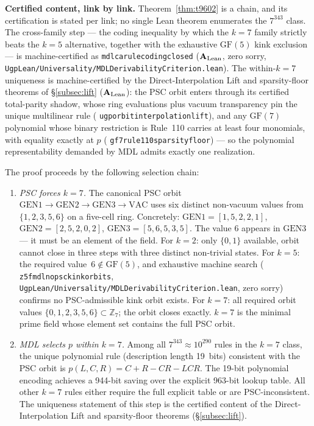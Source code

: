 \documentclass[11pt]{article}
\theoremstyle{remark}
\newcommand{\ZS}{\ensuremath{\mathbb{Z}_7}}
\newcommand{\GF}[1]{\ensuremath{\mathrm{GF}(#1)}}
\newcommand{\lean}[1]{%
  \penalty-100
  \begingroup\def\_{\textunderscore\allowbreak}\texttt{#1}\endgroup}
\newcommand{\CatAL}{\texorpdfstring{\ensuremath{\textbf{A}_{\rm Lean}}}{A-Lean}}
\begin{document}
\medskip
\noindent\textbf{Certified content, link by link.}
Theorem~\ref{thm:t9602} is a chain, and its certification is stated per
link; no single Lean theorem enumerates the $7^{343}$ class. The
cross-family step --- the coding inequality by which the $k = 7$ family
strictly beats the $k = 5$ alternative, together with the exhaustive
$\GF{5}$ kink exclusion --- is machine-certified as
\lean{mdl\_ca\_rule\_coding\_closed} (\CatAL{}, zero sorry,
\lean{UgpLean/Universality/MDLDerivabilityCriterion.lean}). The
within-$k{=}7$ uniqueness is machine-certified by the Direct-Interpolation
Lift and sparsity-floor theorems of §\ref{subsec:lift} (\CatAL{}): the PSC
orbit enters through its certified total-parity shadow, whose ring
evaluations plus vacuum transparency pin the unique multilinear rule
(\lean{ugp\_orbit\_interpolation\_lift}), and any $\GF{7}$ polynomial whose
binary restriction is Rule~110 carries at least four monomials, with
equality exactly at $p$ (\lean{gf7\_rule110\_sparsity\_floor}) --- so the
polynomial representability demanded by MDL admits exactly one realization.

The proof proceeds by the following selection chain:

\begin{enumerate}[leftmargin=2em]
  \item \emph{PSC forces $k = 7$.} The canonical PSC orbit
    $\mathrm{GEN}1 \to \mathrm{GEN}2 \to \mathrm{GEN}3 \to \mathrm{VAC}$
    uses six distinct non-vacuum values from $\{1,2,3,5,6\}$ on a five-cell
    ring. Concretely: $\mathrm{GEN}1 = [1,5,2,2,1]$,
    $\mathrm{GEN}2 = [2,5,2,0,2]$, $\mathrm{GEN}3 = [5,6,5,3,5]$. The value
    $6$ appears in $\mathrm{GEN}3$ --- it must be an element of the field. For
    $k = 2$: only $\{0,1\}$ available, orbit cannot close in three steps
    with three distinct non-trivial states. For $k = 5$: the
    required value~$6 \notin \mathrm{GF}(5)$, and exhaustive machine search
    (\lean{z5\_fmdl\_no\_psc\_kink\_orbits},
    \lean{UgpLean/Universality/MDLDerivabilityCriterion.lean}, zero sorry)
    confirms no PSC-admissible
    kink orbit exists. For $k = 7$: all required orbit values
    $\{0,1,2,3,5,6\} \subset \ZS$; the orbit closes exactly. $k = 7$ is the
    minimal prime field whose element set contains the full PSC orbit.
  \item \emph{MDL selects $p$ within $k = 7$.} Among all $7^{343} \approx
    10^{290}$ rules in the $k = 7$ class, the unique polynomial rule
    (description length 19~bits) consistent with the PSC orbit is $p(L,C,R) =
    C+R-CR-LCR$. The 19-bit polynomial encoding achieves a 944-bit saving
    over the explicit 963-bit lookup table. All other $k = 7$ rules either
    require the full explicit table or are PSC-inconsistent. The uniqueness
    statement of this step is the certified content of the
    Direct-Interpolation Lift and sparsity-floor theorems
    (§\ref{subsec:lift}).
\end{enumerate}
\end{document}
